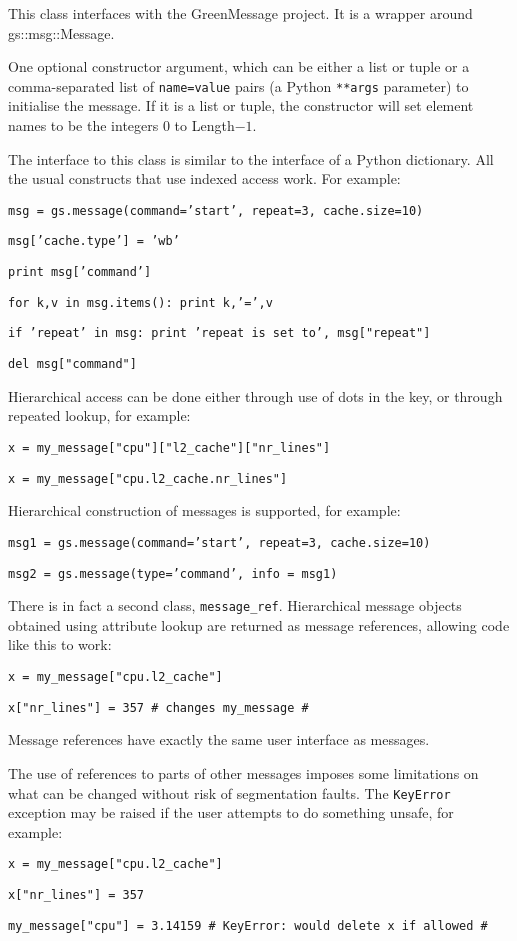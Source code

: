 \documentclass[12pt,oneside]{gsbook}
\begin{document}
 { This class interfaces with the GreenMessage
  project. It is a wrapper around gs::msg::Message.

One optional constructor argument, which can be either a list or
tuple or a comma-separated list of \texttt{name=value}
pairs (a Python \texttt{**args} parameter) to initialise the message.
If it is a list or tuple, the constructor will set element names to
be the integers $0$ to Length$-1$.

The interface to this class is similar to the interface of a Python
dictionary. All the usual constructs that use indexed access work.
For example:

\texttt{msg = gs.message(command='start', repeat=3, cache.size=10)}

\texttt{msg['cache.type'] = 'wb'}

\texttt{print msg['command']}

\texttt{for k,v in msg.items(): print k,'=',v}

\texttt{if 'repeat' in msg: print 'repeat is set to', msg["repeat"]}

\texttt{del msg["command"]}

Hierarchical access can be done either through use of dots in the
key, or through repeated lookup, for example:

\texttt{x = my\_message["cpu"]["l2\_cache"]["nr\_lines"]}

\texttt{x = my\_message["cpu.l2\_cache.nr\_lines"]}


Hierarchical construction of messages is supported,
for example:

\texttt{msg1 = gs.message(command='start', repeat=3, cache.size=10)}

\texttt{msg2 = gs.message(type='command', info = msg1)}

There is in fact a second class, \texttt{message\_ref}.  Hierarchical
message objects obtained using attribute lookup are returned as
message references, allowing code like this to work:

\texttt{x = my\_message["cpu.l2\_cache"]}

\texttt{x["nr\_lines"] = 357  \# changes my\_message \#}

Message references have exactly the same user interface as messages.

The use of references to parts of other messages imposes some limitations
on what can be changed without risk of segmentation faults.  The
\texttt{KeyError} exception may be raised if the user attempts to
do something unsafe, for example:

\texttt{x = my\_message["cpu.l2\_cache"]}

\texttt{x["nr\_lines"] = 357}

\texttt{my\_message["cpu"] = 3.14159  \# KeyError: would delete x if allowed \#}

}
\end{document}
